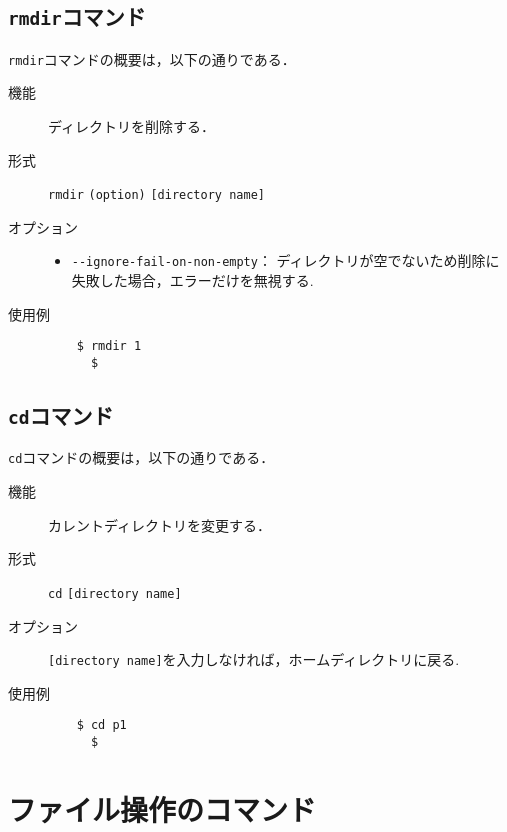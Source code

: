 \documentclass[a4j,11pt]{jarticle}
\begin{document}
\subsection{\texttt{rmdir}コマンド}
\verb|rmdir|コマンドの概要は，以下の通りである．
\begin{description}
  \item[機能] %
    ディレクトリを削除する．
  \item[形式] %
    \verb|rmdir| \verb|(option)| \verb|[directory name]|
  \item[オプション] %
    \begin{itemize}
      \item \verb|--ignore-fail-on-non-empty|：  ディレクトリが空でないため削除に失敗した場合，エラーだけを無視する.
    \end{itemize}
  \item[使用例] %
    \begin{verbatim}
    $ rmdir 1
      $
    \end{verbatim}
\end{description}

\subsection{\texttt{cd}コマンド}
\verb|cd|コマンドの概要は，以下の通りである．
\begin{description}
  \item[機能] %
    カレントディレクトリを変更する．
  \item[形式] %
    \verb|cd| \verb|[directory name]|
  \item[オプション] %
    \verb|[directory name]|を入力しなければ，ホームディレクトリに戻る.
  \item[使用例] %
    \begin{verbatim}
    $ cd p1
      $
    \end{verbatim}
\end{description}
\section{ファイル操作のコマンド}
\end{document}
